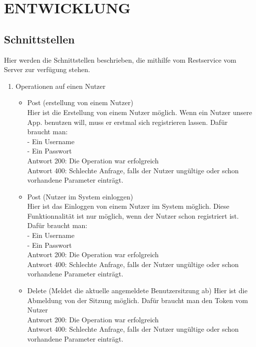 \section{\uppercase{Entwicklung}}
\subsection{Schnittstellen}
Hier werden die Schnittstellen beschrieben, die mithilfe vom Restservice vom Server zur verf\"ugung stehen.
\begin{enumerate}
\item Operationen auf einen Nutzer
	\begin{itemize}
	\item Post (erstellung von einem Nutzer) \\
Hier ist die Erstellung von einem Nutzer m\"oglich. Wenn ein Nutzer unsere App. benutzen will, muss er erstmal sich registrieren lassen. Daf\"ur braucht man: \\
	- Ein Username \\
	- Ein Passwort \\
Antwort 200: Die Operation war erfolgreich\\ 
Antwort 400: Schlechte Anfrage, falls der Nutzer ung\"ultige oder schon vorhandene Parameter eintr\"agt.  

	\item Post (Nutzer im System einloggen) \\
Hier ist das Einloggen von einem Nutzer im System m\"oglich. Diese Funktionnalit\"at ist nur m\"oglich, wenn der Nutzer schon registriert ist. Daf\"ur braucht man: \\
	- Ein Username \\
	- Ein Passwort \\
Antwort 200: Die Operation war erfolgreich \\ 
Antwort 400: Schlechte Anfrage, falls der Nutzer ung\"ultige oder schon vorhandene Parameter eintr\"agt.  
	\item Delete (Meldet die aktuelle angemeldete Benutzersitzung ab)
Hier ist die Abmeldung von der Sitzung m\"oglich. Daf\"ur braucht man den Token vom Nutzer \\
Antwort 200: Die Operation war erfolgreich \\ 
Antwort 400: Schlechte Anfrage, falls der Nutzer ung\"ultige oder schon vorhandene Parameter eintr\"agt.  
	\end{itemize}


\end{enumerate}
